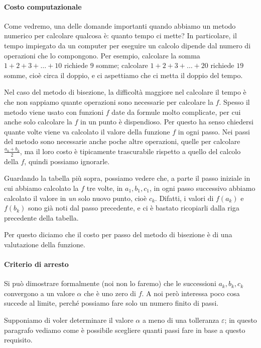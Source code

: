 \documentclass[a4paper]{report}
\theoremstyle{definiton}
\theoremstyle{remark}
\begin{document}
\paragraph{Costo computazionale} Come vedremo, una delle domande importanti quando abbiamo un metodo numerico per calcolare qualcosa è: quanto tempo ci mette? In particolare, il tempo impiegato da un computer per eseguire un calcolo dipende dal numero di operazioni che lo compongono. Per esempio, calcolare la somma $1+2+3+\dots+10$ richiede $9$ somme; calcolare $1+2+3+\dots+20$ richiede $19$ somme, cioè circa il doppio, e ci aspettiamo che ci metta il doppio del tempo.

Nel caso del metodo di bisezione, la difficoltà maggiore nel calcolare il tempo è che non sappiamo quante operazioni sono necessarie per calcolare la $f$. Spesso il metodo viene usato con funzioni $f$ date da formule molto complicate, per cui anche solo calcolare la $f$ in un punto è dispendioso. Per questo ha senso chiedersi quante volte viene va calcolato il valore della funzione $f$ in ogni passo. Nei passi del metodo sono necessarie anche poche altre operazioni, quelle per calcolare $\frac{a_k+b_k}{2}$, ma il loro costo è tipicamente trascurabile rispetto a quello del calcolo della $f$, quindi possiamo ignorarle.

Guardando la tabella più sopra, possiamo vedere che, a parte il passo iniziale in cui abbiamo calcolato la $f$ tre volte, in $a_1,b_1,c_1$, in ogni passo successivo abbiamo calcolato il valore in \emph{un} solo nuovo punto, cioè $c_k$. Difatti, i valori di $f(a_k)$ e $f(b_k)$ sono già noti dal passo precedente, e ci è bastato ricopiarli dalla riga precedente della tabella.

Per questo diciamo che il costo per passo del metodo di bisezione è di una valutazione della funzione.

\paragraph{Criterio di arresto} Si può dimostrare formalmente (noi non lo faremo) che le successioni $a_k,b_k,c_k$ convergono a un valore $\alpha$ che è uno zero di $f$. A noi però interessa poco cosa succede al limite, perché possiamo fare solo un numero finito di passi.


Supponiamo di voler determinare il valore $\alpha$ a meno di una tolleranza $\varepsilon$; in questo paragrafo vediamo come è possibile scegliere quanti passi fare in base a questo requisito.
\end{document}
